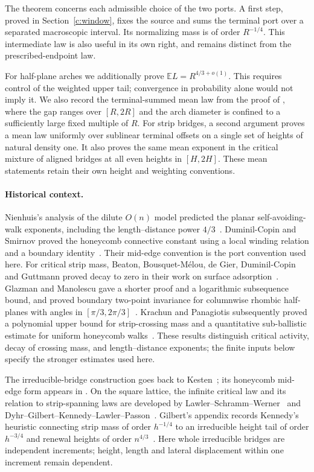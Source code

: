The theorem concerns each admissible choice of the two ports. A first
step, proved in Section~\ref{c:window}, fixes the source and sums the
terminal port over a separated macroscopic interval. Its normalizing
mass is of order $R^{-1/4}$. This intermediate law is also useful in its
own right, and remains distinct from the prescribed-endpoint law.

For half-plane arches we additionally prove
$\mathbb E L=R^{4/3+o(1)}$. This requires control of the weighted upper
tail; convergence in probability alone would not imply it. We also record
the terminal-summed mean law from the proof of \cite[Theorem 8.1]{Renewal},
where the gap ranges over $[R,2R]$ and the arch diameter is confined to a
sufficiently large fixed multiple of $R$. For strip
bridges, a second argument proves a mean law uniformly over sublinear
terminal offsets on a single set of heights of natural density one.
It also proves the same mean exponent in the critical mixture of aligned
bridges at all even heights in $[H,2H]$. These mean statements retain their
own height and weighting conventions.

\paragraph{Historical context.}
Nienhuis's analysis of the dilute $O(n)$ model predicted the planar
self-avoiding-walk exponents, including the length--distance power
$4/3$~\cite{Nienhuis1982}. Duminil-Copin and Smirnov proved the honeycomb
connective constant using a local winding relation and a boundary
identity~\cite{DuminilCopinSmirnov2012}. Their mid-edge convention is the
port convention used here. For critical strip mass, Beaton, Bousquet-M\'elou, de Gier,
Duminil-Copin and Guttmann proved decay to zero in their work on surface
adsorption~\cite{BeatonEtAl2014}. Glazman and Manolescu gave a shorter
proof and a logarithmic subsequence bound, and proved boundary two-point
invariance for columnwise rhombic half-planes with angles in
$[\pi/3,2\pi/3]$~\cite{GlazmanManolescu2017}. Krachun and Panagiotis
subsequently proved a polynomial upper bound for strip-crossing mass
and a quantitative sub-ballistic estimate for uniform honeycomb
walks~\cite{KrachunPanagiotis2026}. These results distinguish critical
activity, decay of crossing mass, and length--distance exponents;
the finite inputs below specify the stronger estimates used here.

The irreducible-bridge construction goes back to
Kesten~\cite{Kesten1963}; its honeycomb mid-edge form appears in
\cite[Appendix]{BeatonEtAl2014}. On the square lattice, the infinite
critical law and its relation to strip-spanning laws are developed by
Lawler--Schramm--Werner~\cite[Appendix]{LawlerSchrammWerner2004} and
Dyhr--Gilbert--Kennedy--Lawler--Passon~\cite[Section 2.4]{DyhrEtAl2011}.
Gilbert's appendix records Kennedy's heuristic connecting strip mass
of order $h^{-1/4}$ to an irreducible height tail of order $h^{-3/4}$
and renewal heights of order $n^{4/3}$~\cite[Appendix]{Gilbert2015}.
Here whole irreducible bridges are independent increments; height,
length and lateral displacement within one increment remain dependent.

